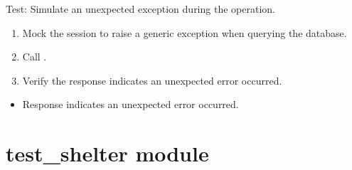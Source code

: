 \documentclass[letterpaper,10pt,english]{sphinxmanual}
\begin{document}
\begin{fulllineitems}
\label{\detokenize{test:test.test_room.test_update_room_name_unexpected_exception}}
\pysigstartsignatures
\pysiglinewithargsret
{}
{\sphinxparamcomma {}}
{}
\pysigstopsignatures
\sphinxAtStartPar
Test: Simulate an unexpected exception during the operation.
\begin{description}
\begin{enumerate}
%
\item {} 
\sphinxAtStartPar
Mock the session to raise a generic exception when querying the database.

\item {} 
\sphinxAtStartPar
Call .

\item {} 
\sphinxAtStartPar
Verify the response indicates an unexpected error occurred.

\end{enumerate}

\begin{itemize}
\item {} 
\sphinxAtStartPar
Response indicates an unexpected error occurred.

\end{itemize}

\end{description}

\end{fulllineitems}



\section{test\_shelter module}
\label{\detokenize{test:module-test.test_shelter}}\label{\detokenize{test:test-shelter-module}}
\end{document}
